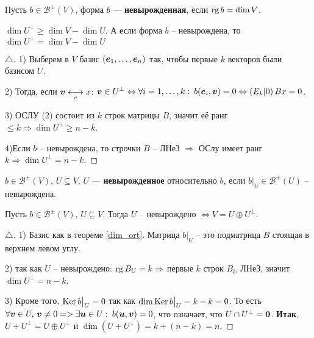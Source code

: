 \begin{to_def} 
	Пусть  $b \in \mathcal{B}^\pm (V)$, форма $b$ --- \textbf{невырожденная},
	 если $\mathop{\mathrm{rg}}\nolimits b = \dim V$.
\end{to_def}

\begin{to_thr} 
	$\dim U^\bot \geq \dim V - \dim U$. А если форма $b$ -- невырождена, то $\dim U^\bot = \dim V - \dim U$
	\label{dim_ort}
\end{to_thr}

\begin{proof}[$\triangle$]
	1) Выберем в $V$ базис $(\mbox{\boldmath $e$}_1,\ldots,\mbox{\boldmath $e$}_n)$ так, чтобы первые $k$ векторов были базисом $U$.

	2) Тогда, если $\mbox{\boldmath $v$} \underset{e}{\longleftrightarrow} x$: $\mbox{\boldmath $v$} \in U^\bot \Leftrightarrow \forall i = 1,\ldots,k: \: b(\mbox{\boldmath $e$}_i, \mbox{\boldmath $v$}) = 0 \Leftrightarrow \left(E_k | 0\right) B x = 0$.

	3) ОСЛУ (2) состоит из $k$ строк матрицы $B$, значит её ранг $\leq k \Longrightarrow \dim U^\bot \geq n -k$.

	4)Если $b$ -- невырождена, то строчки $B$ -- ЛНеЗ $\Longrightarrow$ ОСлу имеет ранг $k \Longrightarrow \dim U^\bot = n -k$.
\end{proof}

\begin{to_def} 
	$b \in \mathcal{B}^\pm (V), \, U \subseteq V$. $U$ --- \textbf{невырожденное} относительно $b$, если $b \big|_U \in \mathcal{B}^\pm (U)$ -- невырождена. 
\end{to_def}

\begin{to_thr} 
	 Пусть $b \in \mathcal{B}^\pm (V), \, U \subseteq V$. Тогда $U$ -- невырождено $\Longleftrightarrow V = U \oplus U^\bot$.
\end{to_thr}

\begin{proof}[$\triangle$]
	1) Базис как в теореме \eqref{dim_ort}. Матрица $b \big|_U$ -- это подматрица $B$ стоящая в верхнем левом углу.

	2) так как $U$ -- невырождено: $\mathop{\mathrm{rg}}\nolimits B_U = k \Rightarrow$ первые $k$ строк $B_U$ ЛНеЗ, значит $\dim U^\bot = n -k$.

	3) Кроме того, $\mathop{\mathrm{Ker}}\nolimits b \big|_U = 0$ так как $\dim \mathop{\mathrm{Ker}}\nolimits b \big|_U = k - k = 0$. То есть $\forall \mbox{\boldmath $v$} \in U, \, \mbox{\boldmath $v$} \neq 0 => \exists \mbox{\boldmath $u$} \in U: \: b(\mbox{\boldmath $u$},\mbox{\boldmath $v$}) = 0$, что означает, что $U \cap U^\bot = \mbox{\boldmath $0$}$. \textbf{Итак}, $U + U^\bot = U \oplus U^\bot$ и $\dim(U + U^\bot) = k + (n-k) = n$.
\end{proof}

